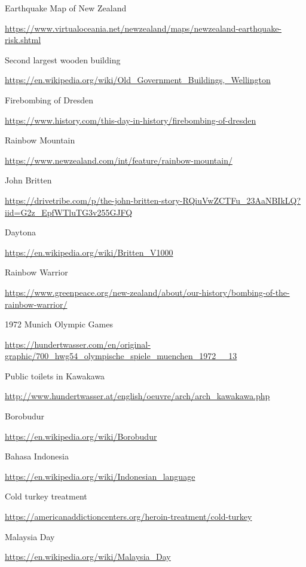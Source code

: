 \begin{thebibliography}{9}
 Earthquake Map of New Zealand

  {\urlsize \url{https://www.virtualoceania.net/newzealand/maps/newzealand-earthquake-risk.shtml}}

 Second largest wooden building

  {\urlsize \url{https://en.wikipedia.org/wiki/Old_Government_Buildings,_Wellington}}

 Firebombing of Dresden

  {\urlsize \url{https://www.history.com/this-day-in-history/firebombing-of-dresden}}

 Rainbow Mountain

  {\urlsize \url{https://www.newzealand.com/int/feature/rainbow-mountain/}}

 John Britten

  {\urlsize \url{https://drivetribe.com/p/the-john-britten-story-RQiuVwZCTFu_23AaNBIkLQ?iid=G2z_EpfWTluTG3v255GJFQ}}

 Daytona

  {\urlsize \url{https://en.wikipedia.org/wiki/Britten_V1000}}

 Rainbow Warrior

  {\urlsize \url{https://www.greenpeace.org/new-zealand/about/our-history/bombing-of-the-rainbow-warrior/}}

 1972 Munich Olympic Games

  {\urlsize \url{https://hundertwasser.com/en/original-graphic/700_hwg54_olympische_spiele_muenchen_1972__13}}

 Public toilets in Kawakawa

  {\urlsize \url{http://www.hundertwasser.at/english/oeuvre/arch/arch_kawakawa.php}}

 Borobudur

  {\urlsize \url{https://en.wikipedia.org/wiki/Borobudur}}

 Bahasa Indonesia

  {\urlsize \url{https://en.wikipedia.org/wiki/Indonesian_language}}

 Cold turkey treatment

  {\urlsize \url{https://americanaddictioncenters.org/heroin-treatment/cold-turkey}}

 Malaysia Day

  {\urlsize \url{https://en.wikipedia.org/wiki/Malaysia_Day}}


\end{thebibliography}
